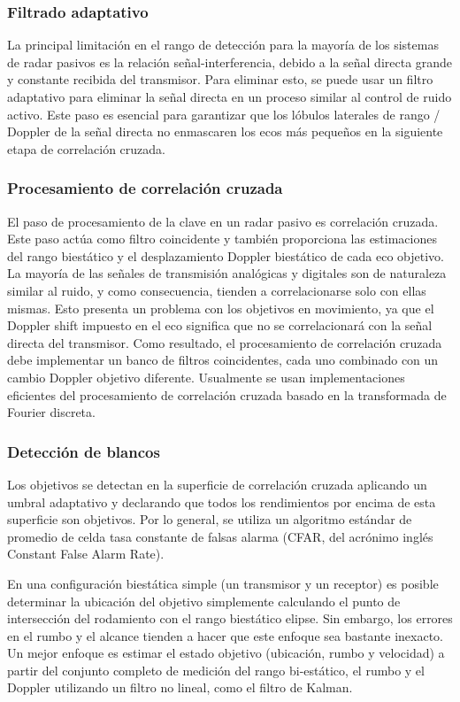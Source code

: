 \subsubsection{Filtrado adaptativo}
La principal limitación en el rango de detección para la mayoría de los sistemas de radar pasivos es la relación señal-interferencia, debido a la señal directa grande y constante recibida del transmisor. Para eliminar esto, se puede usar un filtro adaptativo para eliminar la señal directa en un proceso similar al control de ruido activo. Este paso es esencial para garantizar que los lóbulos laterales de rango / Doppler de la señal directa no enmascaren los ecos más pequeños en la siguiente etapa de correlación cruzada.

\subsubsection{Procesamiento de correlación cruzada}
El paso de procesamiento de la clave en un radar pasivo es correlación cruzada. Este paso actúa como filtro coincidente y también proporciona las estimaciones del rango biestático y el desplazamiento Doppler biestático de cada eco objetivo. La mayoría de las señales de transmisión analógicas y digitales son de naturaleza similar al ruido, y como consecuencia, tienden a correlacionarse solo con ellas mismas. Esto presenta un problema con los objetivos en movimiento, ya que el Doppler shift impuesto en el eco significa que no se correlacionará con la señal directa del transmisor. Como resultado, el procesamiento de correlación cruzada debe implementar un banco de filtros coincidentes, cada uno combinado con un cambio Doppler objetivo diferente. Usualmente se usan implementaciones eficientes del procesamiento de correlación cruzada basado en la transformada de Fourier discreta.

\subsubsection{Detección de blancos}
Los objetivos se detectan en la superficie de correlación cruzada aplicando un umbral adaptativo y declarando que todos los rendimientos por encima de esta superficie son objetivos. Por lo general, se utiliza un algoritmo estándar de promedio de celda tasa constante de falsas alarma (CFAR, del acrónimo inglés Constant False Alarm Rate).

En una configuración biestática simple (un transmisor y un receptor) es posible determinar la ubicación del objetivo simplemente calculando el punto de intersección del rodamiento con el rango biestático elipse. Sin embargo, los errores en el rumbo y el alcance tienden a hacer que este enfoque sea bastante inexacto. Un mejor enfoque es estimar el estado objetivo (ubicación, rumbo y velocidad) a partir del conjunto completo de medición del rango bi-estático, el rumbo y el Doppler utilizando un filtro no lineal, como el filtro de Kalman.



